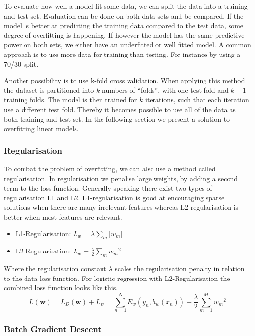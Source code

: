 To evaluate how well a model fit some data, we can split the data into a training and test set. Evaluation can be done on both data sets and be compared. If the model is better at predicting the training data compared to the test data, some degree of overfitting is happening. If however the model has the same predictive power on both sets, we either have an underfitted or well fitted model. A common approach is to use more data for training than testing. For instance by using a 70/30 split.

Another possibility is to use k-fold cross validation.
When applying this method the dataset is partitioned into $k$ numbers of ``folds'', with one test fold and $k-1$ training folds.
The model is then trained for $k$ iterations, such that each iteration use a different test fold.
Thereby it becomes possible to use all of the data as both training and test set. In the following section we present a solution to overfitting linear models.

\subsubsection{Regularisation}

To combat the problem of overfitting, we can also use a method called regularisation.
In regularisation we penalise large weights, by adding a second term to the loss function.
Generally speaking there exist two types of regularisation L1 and L2.
L1-regularisation is good at encouraging sparse solutions when there are many irrelevant features whereas L2-regularisation is better when most features are relevant.

\begin{itemize}
\item L1-Regularisation: $L_w = \lambda \sum_{m} \vert w_m \vert $
\item L2-Regularisation: $L_w = \frac{\lambda}{2} \sum_{m} {w_m}^2$
\end{itemize}

Where the regularisation constant $\lambda$ scales the regularisation penalty in relation to the data loss function. For logistic regression with L2-Regularisation the combined loss function looks like this.
\[ L(\mathbf{w})
  = L_D(\mathbf{w}) + L_w 
  = \sum_{n=1}^N E_w(y_n, h_w(x_n)) + \frac{\lambda}{2} \sum_{m=1}^{M} {w_m}^2 \] 

\subsubsection{Batch Gradient Descent}\label{sec:batch}

